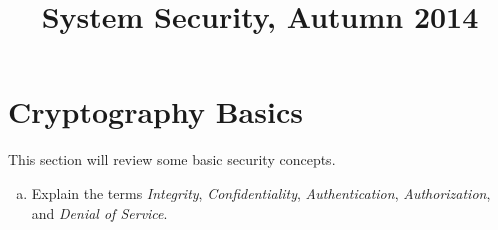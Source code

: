 \documentclass[a4paper,11pt]{article}
\title{System Security, Autumn 2014}
\newif\ifsolution\solutionfalse
\newcommand{\includeonlyinsolution}[1]{\ifsolution#1\fi}
\newenvironment{solution}%
{\par{\noindent\small\textit{Solution:}}\vspace{-12pt}\begin{framed}}%
{\end{framed}\par}
\begin{document}
\maketitle

\section{Cryptography Basics}
This section will review some basic security concepts.
\begin{enumerate}[(a)]
\item Explain the terms \emph{Integrity}, \emph{Confidentiality},
  \emph{Authentication}, \emph{Authorization}, and 
  \emph{Denial of Service}.
\includeonlyinsolution{\begin{solution}
\begin{itemize}
  \item \emph{Integrity}: Prevention of unauthorized modification of information \cite{CompSec}.
  \item \emph{Confidentiality}: Prevention of unauthorized disclosure of information \cite{CompSec}.
  \item \emph{Authentication}: Verifying the identity of a given entity.
  \item \emph{Authorization}: Specifying access rights of a given entity. Required prior authentication.
  \item \emph{Denial of Service}: Prevention of authorized access to resources
  or the delaying of time-critical operations \cite{ISO7498}.
\end{itemize}
\end{solution}}


\end{enumerate}
\end{document}
